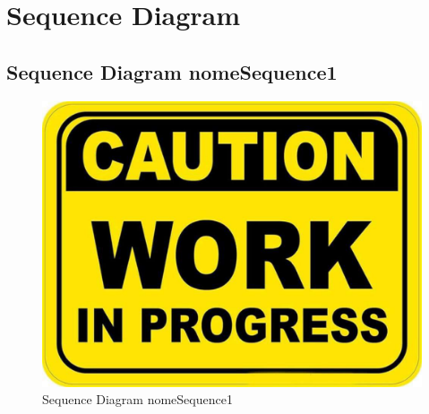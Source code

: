 \chapter{Sequence Diagram}
    \section{Sequence Diagram nomeSequence1}
        \begin{figure}[htbp!]
            \centering
                \vspace{2\baselineskip}
                \includegraphics[width=\linewidth]{Immagini/WorkInProgress.pdf}
            \caption{Sequence Diagram nomeSequence1}
            \label{fig:Sequence Diagram nomeSequence1}
        \end{figure}

    \newpage


